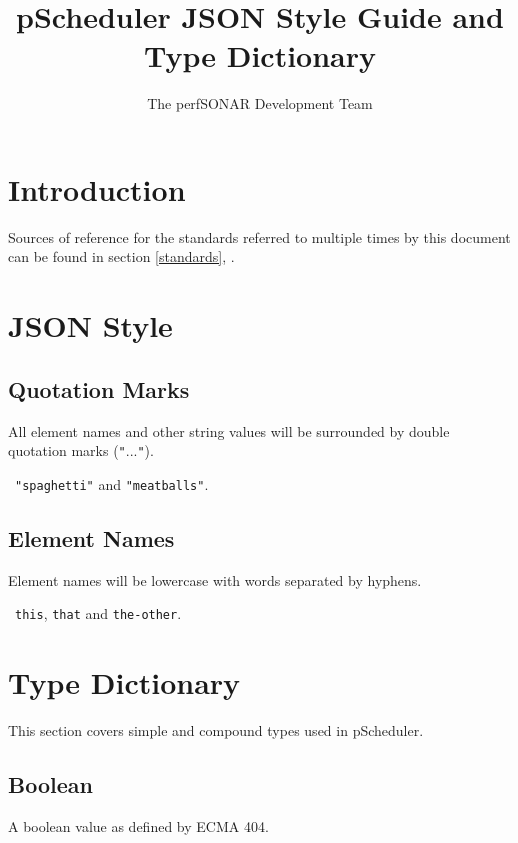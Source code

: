 \documentclass[10pt]{article}
\title{pScheduler JSON Style Guide and Type Dictionary}
\author{The perfSONAR Development Team}
\begin{document}
\maketitle

%
%

\def\source#1#2{{\bf #1:}  \url{#2}}


%
%

\section{Introduction}

Sources of reference for the standards referred to multiple times by
this document can be found in section \autoref{standards}, {\it
  }.


%
%

\section{JSON Style}

\subsection{Quotation Marks}
All element names and other string values will be surrounded by double
quotation marks ({\tt "}...{\tt"}).

\example\ {\tt "spaghetti"} and {\tt "meatballs"}.


\subsection{Element Names}
Element names will be lowercase with words separated by hyphens.

\example\ {\tt this}, {\tt that} and {\tt the-other}.


%
%

\section{Type Dictionary}

This section covers simple and compound types used in pScheduler.


\subsection{Boolean}
A boolean value as defined by ECMA 404.
\end{document}
